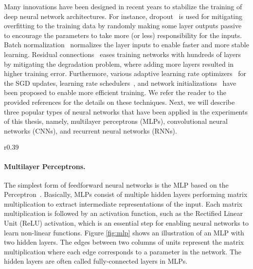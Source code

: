 Many innovations have been designed in recent years to stabilize the training of deep neural network architectures. For instance, dropout~\cite{srivastava2014dropout} is used for mitigating overfitting to the training data by randomly making some layer outputs passive to encourage the parameters to take more (or less) responsibility for the inputs. %
Batch normalization~\cite{ioffe2015batch, santurkar2018does} normalizes the layer inputs to enable faster and more stable learning. Residual connections~\cite{he2016deep} eases training networks with hundreds of layers by mitigating the degradation problem, where adding more layers resulted in higher training error. Furthermore, various adaptive learning rate optimizers~\cite{kingma2014adam,liu2019variance,tieleman2012lecture} for the SGD updates, learning rate schedulers~\cite{smith2017cyclical}, and network initializations~\cite{glorot2010understanding, he2015delving} have been proposed to enable more efficient training. We refer the reader to the provided references for the details on these techniques.
Next, we will describe three popular types of neural networks that have been applied in the experiments of this thesis, namely, multilayer perceptrons (MLPs), convolutional neural networks (CNNs), and recurrent neural networks (RNNs).

\vspace{-3mm}
\begin{wrapfigure}{r}{0.39\textwidth}
	\centering
	\vspace{-3mm}
	\resizebox{0.39\textwidth}{!}{
		
	}
	\captionsetup{width=.9\linewidth}
	\caption{Illustration of MLP with two hidden layers.}
	\vspace{-3mm}
	\label{fig:mlp}
\end{wrapfigure}
\paragraph{Multilayer Perceptrons.} The simplest form of feedforward neural networks is the MLP based on the Perceptron~\cite{rosenblatt1958perceptron}. Basically, MLPs consist of multiple hidden layers performing matrix multiplication to extract intermediate representations of the input. Each matrix multiplication is followed by an activation function, such as the Rectified Linear Unit (ReLU) activation, which is an essential step for enabling neural networks to learn non-linear functions. Figure \ref{fig:mlp} shows an illustration of an MLP with two hidden layers. The edges between two columns of units represent the matrix multiplication where each edge corresponds to a parameter in the network. The hidden layers are often called fully-connected layers in MLPs. 

